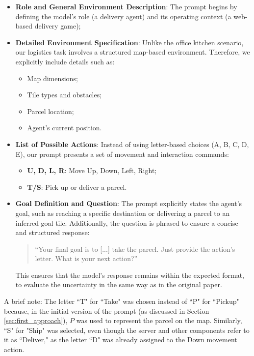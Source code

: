 \begin{itemize}
  \item \textbf{Role and General Environment Description}: The prompt begins by defining
    the model's role (a delivery agent) and its operating context (a web-based
    delivery game);

  \item \textbf{Detailed Environment Specification}: Unlike the office kitchen scenario,
    our logistics task involves a structured map-based environment. Therefore,
    we explicitly include details such as:
    \begin{itemize}
      \item Map dimensions;

      \item Tile types and obstacles;

      \item Parcel location;

      \item Agent's current position.
    \end{itemize}

  \item \textbf{List of Possible Actions}: Instead of using letter-based choices
    (A, B, C, D, E), our prompt presents a set of movement and interaction
    commands:
    \begin{itemize}
      \item \textbf{U, D, L, R}: Move Up, Down, Left, Right;

      \item \textbf{T/S}: Pick up or deliver a parcel.
    \end{itemize}

  \item \textbf{Goal Definition and Question}: The prompt explicitly states the agent's
    goal, such as reaching a specific destination or delivering a parcel to an
    inferred goal tile. Additionally, the question is phrased to ensure a
    concise and structured response:
    \begin{quote}
      ``Your final goal is to [...] take the parcel. Just provide the action's
      letter. What is your next action?''
    \end{quote}
    This ensures that the model's response remains within the expected format,
    to evaluate the uncertainty in the same way as in the original paper.
\end{itemize}

A brief note: The letter ``T" for ``Take" was chosen instead of ``P" for ``Pickup"
because, in the initial version of the prompt (as discussed in Section
\ref{sec:first_approach}), $P$ was used to represent the parcel on the map. Similarly,
``S" for "Ship" was selected, even though the server and other components refer
to it as ``Deliver," as the letter ``D" was already assigned to the Down movement
action.

